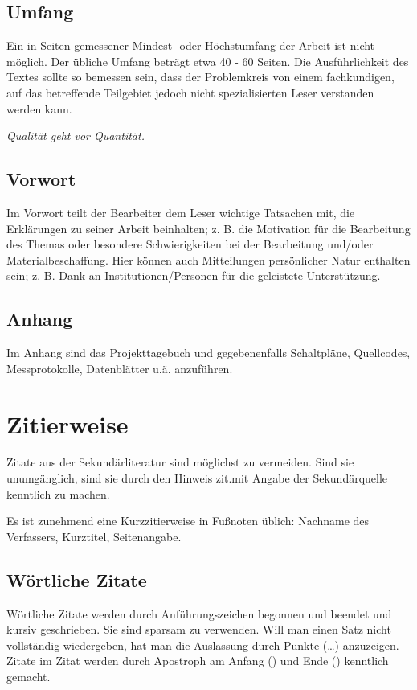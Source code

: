 \subsection{Umfang}

Ein in Seiten gemessener Mindest- oder Höchstumfang der Arbeit ist nicht möglich. Der übliche Umfang beträgt etwa 40 - 60 Seiten. Die Ausführlichkeit des Textes sollte so bemessen sein, dass der Problemkreis von einem fachkundigen, auf das betreffende Teilgebiet jedoch nicht spezialisierten Leser verstanden werden kann. 

\emph{\glqq Qualität geht vor Quantität.\grqq}


\subsection{Vorwort}

Im Vorwort teilt der Bearbeiter dem Leser wichtige Tatsachen mit, die Erklärungen zu seiner Arbeit beinhalten; z. B. die Motivation für die Bearbeitung des Themas oder besondere Schwierigkeiten bei der Bearbeitung und/oder Materialbeschaffung. Hier können auch Mitteilungen persönlicher Natur enthalten sein; z. B. Dank an Institutionen/Personen für die geleistete Unterstützung. 

\subsection{Anhang}

Im Anhang sind das Projekttagebuch und gegebenenfalls Schaltpläne, Quellcodes, Messprotokolle, Datenblätter u.ä. anzuführen. 

\section{Zitierweise}

Zitate aus der Sekundärliteratur sind möglichst zu vermeiden. Sind sie unumgänglich, sind sie durch den Hinweis \glqq zit.\grqq mit Angabe der Sekundärquelle kenntlich zu machen. 

Es ist zunehmend eine Kurzzitierweise in Fußnoten üblich: 
Nachname des Verfassers, Kurztitel, Seitenangabe. 

\subsection{Wörtliche Zitate}
Wörtliche Zitate werden durch Anführungszeichen begonnen und beendet und kursiv geschrieben. Sie sind sparsam zu verwenden. Will man einen Satz nicht vollständig wiedergeben, hat man die Auslassung durch Punkte (\ldots) anzuzeigen. Zitate im Zitat werden durch Apostroph  am Anfang (\glq) und  Ende (\grq) kenntlich gemacht. 

